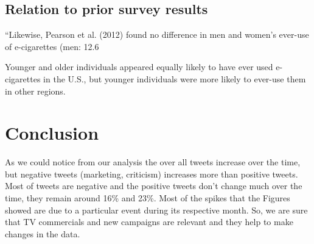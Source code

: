 \documentclass{sig-alternate}
\begin{document}
\subsection{Relation to prior survey results}
``Likewise, Pearson et al. (2012) found no difference in men and women's ever-use of e-cigarettes (men: 12.6%

Younger and older individuals appeared equally likely to have ever used e-cigarettes in the U.S., but younger individuals were more likely to ever-use them in other regions. 

\section{Conclusion}

As we could notice from our analysis the over all tweets increase over the time, but negative tweets (marketing, criticism) increases more than positive tweets. Most of tweets are negative and the positive tweets don't change much over the time, they remain around 16\% and 23\%. Most of the spikes that the Figures showed are due to a particular event during its respective month. So, we are sure that TV commercials and new campaigns are relevant and they help to make changes in the data.

%
%
\end{document}
